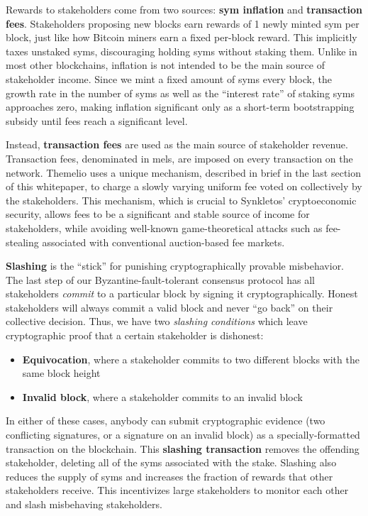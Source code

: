 \documentclass[headinclude,12pt]{scrbook}
\begin{document}
Rewards to stakeholders come from two sources: \textbf{sym inflation}
and \textbf{transaction fees}. Stakeholders proposing new blocks earn
rewards of 1 newly minted sym per block, just like how Bitcoin miners
earn a fixed per-block reward. This implicitly taxes unstaked syms,
discouraging holding syms without staking them. Unlike in most other
blockchains, inflation is not intended to be the main source of
stakeholder income. Since we mint a fixed amount of syms every block,
the growth rate in the number of syms as well as the ``interest rate''
of staking syms approaches zero, making inflation significant only as a
short-term bootstrapping subsidy until fees reach a significant level.

Instead, \textbf{transaction fees} are used as the main source of
stakeholder revenue. Transaction fees, denominated in mels, are imposed
on every transaction on the network. Themelio uses a unique mechanism,
described in brief in the last section of this whitepaper, to charge a
slowly varying uniform fee voted on collectively by the stakeholders.
This mechanism, which is crucial to Synkletos' cryptoeconomic security,
allows fees to be a significant and stable source of income for
stakeholders, while avoiding well-known game-theoretical attacks such as fee-stealing
associated with conventional auction-based fee markets.

\textbf{Slashing} is the ``stick'' for punishing cryptographically
provable misbehavior. The last step of our Byzantine-fault-tolerant
consensus protocol has all stakeholders \emph{commit} to a particular
block by signing it cryptographically. Honest stakeholders will always
commit a valid block and never ``go back'' on their collective decision.
Thus, we have two \emph{slashing conditions} which leave cryptographic
proof that a certain stakeholder is dishonest:

\begin{itemize}
    \item
          \textbf{Equivocation}, where a stakeholder commits to two different
          blocks with the same block height
    \item
          \textbf{Invalid block}, where a stakeholder commits to an invalid
          block
\end{itemize}

In either of these cases, anybody can submit cryptographic evidence (two
conflicting signatures, or a signature on an invalid block) as a
specially-formatted transaction on the blockchain. This \textbf{slashing
    transaction} removes the offending stakeholder, deleting all of the syms
associated with the stake. Slashing also reduces the supply of syms and
increases the fraction of rewards that other stakeholders receive. This
incentivizes large stakeholders to monitor each other and slash
misbehaving stakeholders.
\end{document}
